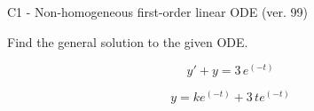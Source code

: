 \begin{exercise}
  \begin{exerciseTitle}C1 - Non-homogeneous first-order linear ODE (ver. 99)\end{exerciseTitle}
  \begin{exerciseStatement}
    
Find the general solution to the given ODE.

    
\[y'+y= 3 \, e^{\left(-t\right)}\]

  \end{exerciseStatement}
  \begin{exerciseAnswer}
    
\[y= k e^{\left(-t\right)} + 3 \, t e^{\left(-t\right)}\]

  \end{exerciseAnswer}
\end{exercise}